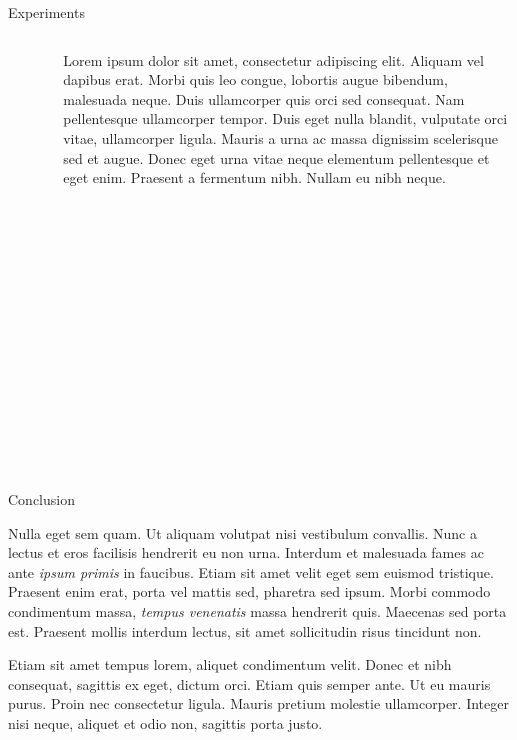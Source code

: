 \documentclass[final]{beamer}
\newlength{\colwidth}
\begin{document}
\begin{frame}[t]
\begin{columns}[t]
\begin{column}{\colwidth}
\begin{block}{Experiments}
\begin{columns}
\begin{column}{0.4\textwidth}
\begin{center}
      \begin{figure}
      \caption{Another figure caption.}
    \end{figure}
   \end{center}
\end{column}
\begin{column}{0.6\textwidth}  %
\justify
Lorem ipsum dolor sit amet, consectetur adipiscing elit. Aliquam vel dapibus erat. Morbi quis leo congue, lobortis augue bibendum, malesuada neque. Duis ullamcorper quis orci sed consequat. Nam pellentesque ullamcorper tempor. Duis eget nulla blandit, vulputate orci vitae, ullamcorper ligula. Mauris a urna ac massa dignissim scelerisque sed et augue. Donec eget urna vitae neque elementum pellentesque et eget enim. Praesent a fermentum nibh. Nullam eu nibh neque. 
\end{column}
\end{columns}


  \end{block}

  \begin{block}{Conclusion}

    Nulla eget sem quam. Ut aliquam volutpat nisi vestibulum convallis. Nunc a
    lectus et eros facilisis hendrerit eu non urna. Interdum et malesuada fames
    ac ante \textit{ipsum primis} in faucibus. Etiam sit amet velit eget sem
    euismod tristique. Praesent enim erat, porta vel mattis sed, pharetra sed
    ipsum. Morbi commodo condimentum massa, \textit{tempus venenatis} massa
    hendrerit quis. Maecenas sed porta est. Praesent mollis interdum lectus,
    sit amet sollicitudin risus tincidunt non.

    Etiam sit amet tempus lorem, aliquet condimentum velit. Donec et nibh
    consequat, sagittis ex eget, dictum orci. Etiam quis semper ante. Ut eu
    mauris purus. Proin nec consectetur ligula. Mauris pretium molestie
    ullamcorper. Integer nisi neque, aliquet et odio non, sagittis porta justo.


\end{block}
\end{column}
\end{columns}
\end{frame}
\end{document}
